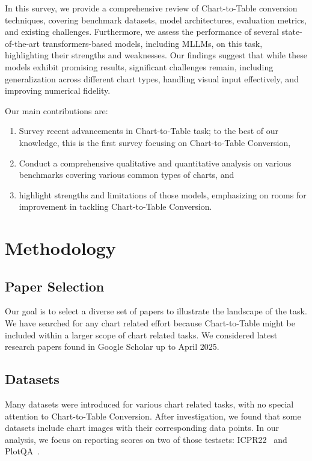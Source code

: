 \documentclass[
	letterpaper, %
]{jdf}
\begin{document}
In this survey, we provide a comprehensive review of Chart-to-Table conversion techniques, covering benchmark datasets, model architectures, evaluation metrics, and existing challenges.
Furthermore, we assess the performance of several state-of-the-art transformers-based models, including MLLMs, on this task, highlighting their strengths and weaknesses.
Our findings suggest that while these models exhibit promising results, significant challenges remain, including generalization across different chart types, handling visual input effectively, and improving numerical fidelity.

Our main contributions are:
\begin{enumerate}
     \item Survey recent advancements in Chart-to-Table task; to the best of our knowledge, this is the first survey focusing on Chart-to-Table Conversion,
     \item Conduct a comprehensive qualitative and quantitative analysis on various benchmarks covering various common types of charts, and
     \item highlight strengths and limitations  of those models, emphasizing on rooms for improvement in tackling Chart-to-Table Conversion.
       \end{enumerate}

\section{Methodology}\label{sect:methodology}
\subsection{Paper Selection}\label{ssect:paper-selection}
Our goal is to select a diverse set of papers to illustrate the landscape of the task.
We have searched for any chart related effort because Chart-to-Table might be included within a larger scope of chart related tasks.
We considered latest research papers found in Google Scholar up to April 2025.
\subsection{Datasets}\label{ssect:datasets}
Many datasets were introduced for various chart related tasks, with no special attention to Chart-to-Table Conversion.
After investigation, we found that some datasets include chart images with their corresponding data points.
In our analysis, we focus on reporting scores on two of those testsets: ICPR22~\cite{rousseau2023pattern} and PlotQA~\cite{methani2020plotqa}.
\end{document}
